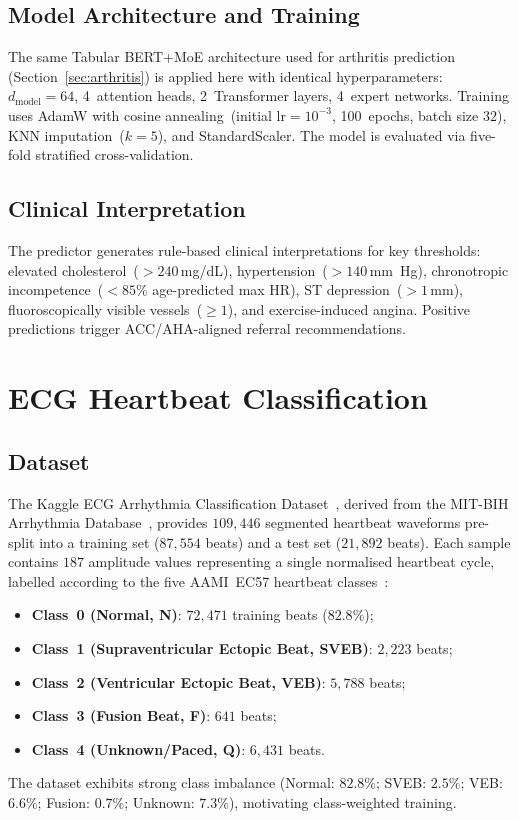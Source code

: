 \documentclass[journal,10pt,twoside]{IEEEtran}
\begin{document}
\subsection{Model Architecture and Training}

The same Tabular BERT+MoE architecture used for arthritis prediction
(Section~\ref{sec:arthritis}) is applied here with identical hyperparameters:
$d_\text{model}{=}64$, 4~attention heads, 2~Transformer layers, 4~expert networks.
Training uses AdamW with cosine annealing~(initial $\text{lr}{=}10^{-3}$,
100~epochs, batch size $32$), KNN imputation~($k{=}5$), and StandardScaler.
The model is evaluated via five-fold stratified cross-validation.

\subsection{Clinical Interpretation}

The predictor generates rule-based clinical interpretations for key thresholds:
elevated cholesterol~($>240$\,mg/dL), hypertension~($>140$\,mm~Hg),
chronotropic incompetence~($<85\%$ age-predicted max HR), ST depression~($>1$\,mm),
fluoroscopically visible vessels~($\geq 1$), and exercise-induced angina.
Positive predictions trigger ACC/AHA-aligned referral recommendations.

\section{ECG Heartbeat Classification}
\label{sec:mitbih}

\subsection{Dataset}

The Kaggle ECG Arrhythmia Classification Dataset~\cite{sadmansakib2021},
derived from the MIT-BIH Arrhythmia Database~\cite{moody2001}, provides
$109{,}446$ segmented heartbeat waveforms pre-split into a training set
($87{,}554$ beats) and a test set ($21{,}892$ beats).
Each sample contains $187$ amplitude values representing a single normalised
heartbeat cycle, labelled according to the five AAMI~EC57 heartbeat
classes~\cite{de2004}:
\begin{itemize}
  \item \textbf{Class~0 (Normal, N)}: $72{,}471$ training beats ($82.8\%$);
  \item \textbf{Class~1 (Supraventricular Ectopic Beat, SVEB)}: $2{,}223$ beats;
  \item \textbf{Class~2 (Ventricular Ectopic Beat, VEB)}: $5{,}788$ beats;
  \item \textbf{Class~3 (Fusion Beat, F)}: $641$ beats;
  \item \textbf{Class~4 (Unknown/Paced, Q)}: $6{,}431$ beats.
\end{itemize}
The dataset exhibits strong class imbalance (Normal: $82.8\%$; SVEB: $2.5\%$;
VEB: $6.6\%$; Fusion: $0.7\%$; Unknown: $7.3\%$), motivating class-weighted
training.
\end{document}
